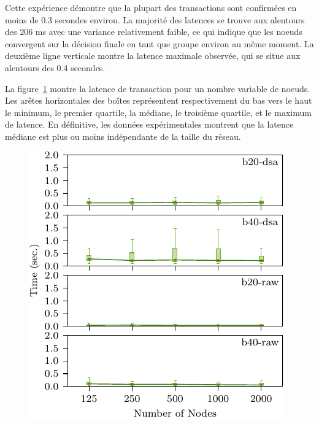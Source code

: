 Cette expérience démontre que la plupart des transactions sont confirmées en moins de 0.3 secondes environ.
La majorité des latences se trouve aux alentours des 206 ms avec une variance relativement faible, ce qui
indique que les noeuds convergent sur la décision finale en tant que groupe environ au même moment. La deuxième
ligne verticale montre la latence maximale observée, qui se situe aux alentours des 0.4 secondes.

La figure~\ref{fig:eval-lat2} montre la latence de transaction pour un nombre variable de noeuds. Les arêtes
horizontales des boîtes représentent respectivement du bas vers le haut le minimum, le premier quartile, la médiane,
le troisième quartile, et le maximum de latence. En définitive, les données expérimentales montrent que la latence
médiane est plus ou moins indépendante de la taille du réseau.

\begin{figure}[h]
\includegraphics[width=\linewidth]{figures/lat2.pdf}
\label{fig:eval-lat2}
\end{figure}


